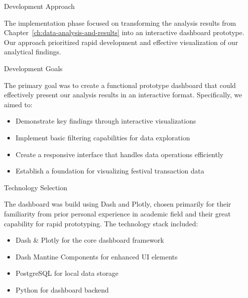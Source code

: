 \begin{section}{Development Approach}
	\label{sec:implementation-development-approach}

	The implementation phase focused on transforming the analysis results from Chapter~\ref{ch:data-analysis-and-results} into an interactive dashboard prototype.
	Our approach prioritized rapid development and effective visualization of our analytical findings.

	\begin{subsection}{Development Goals}
		\label{subsec:implementation-development-approach-goals}

		The primary goal was to create a functional prototype dashboard that could effectively present our analysis results in an interactive format.
		Specifically, we aimed to:
		\begin{itemize}
			\item Demonstrate key findings through interactive visualizations
			\item Implement basic filtering capabilities for data exploration
			\item Create a responsive interface that handles data operations efficiently
			\item Establish a foundation for visualizing festival transaction data
		\end{itemize}

	\end{subsection}

	\begin{subsection}{Technology Selection}
		\label{subsec:implementation-development-approach-technology}

		The dashboard was build using Dash and Plotly, chosen primarily for their familiarity from prior personal experience in academic field and their great capability for rapid prototyping.
		The technology stack included:

		\begin{itemize}
			\item Dash \& Plotly for the core dashboard framework
			\item Dash Mantine Components\cite{sv_snehilvj_dash_mantine_components} for enhanced UI elements
			\item PostgreSQL\cite{tpgdg_17_postgresql_17_a4_pdf} for local data storage
			\item Python for dashboard backend
		\end{itemize}


\end{subsection}
\end{section}
